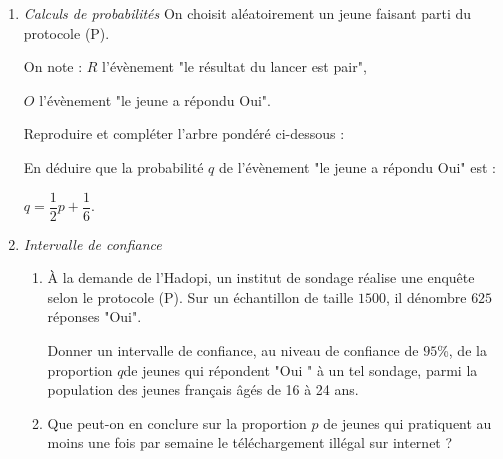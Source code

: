 \begin{enumerate}
     \item
     \textit{Calculs de probabilités}
     On choisit aléatoirement un jeune faisant parti du protocole (P).
     \par
     On note : $R$ l'évènement "le résultat du lancer est pair",
     \par
     $O$ l'évènement "le jeune a répondu Oui".
     \par
     Reproduire et compléter l'arbre pondéré ci-dessous :
\begin{center}
\end{center}
     En déduire que la probabilité $q$ de l'évènement "le jeune a répondu Oui" est :
     \begin{center}$q = \dfrac{1}{2}p+\dfrac{1}{6}.$\end{center}
     \item
     \textit{Intervalle de confiance}
     \begin{enumerate}
          \item
          À la demande de l'Hadopi, un institut de sondage réalise une enquête selon le protocole (P). Sur un échantillon de taille $1500$, il dénombre $625$ réponses "Oui".
          \par
          Donner un intervalle de confiance, au niveau de confiance de $95$\%, de la proportion $q$de jeunes qui répondent "Oui " à un tel sondage, parmi la population des jeunes français âgés de 16 à 24 ans.
          \item
          Que peut-on en conclure sur la proportion $p$ de jeunes qui pratiquent au moins une fois par semaine le téléchargement illégal sur internet ?
     \end{enumerate}
\end{enumerate}
